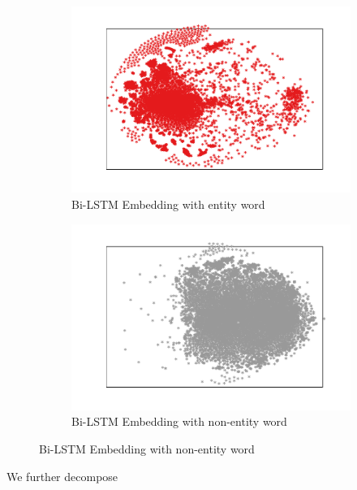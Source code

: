 \documentclass{article}
\begin{document}
\begin{itemize}
\begin{figure}[t]
	\centering
	\begin{subfigure}{0.5\textwidth}
		\includegraphics[width=\linewidth]{bi_lstm_gold_positive.pdf}
		\caption{Bi-LSTM Embedding with entity word}
		\label{fig:bi_lstm_gold_positive}
	\end{subfigure}\hfil 
	\begin{subfigure}{0.5\textwidth}
		\includegraphics[width=\linewidth]{bi_lstm_gold_negative.pdf}
		\caption{Bi-LSTM Embedding with non-entity word}
		\label{fig:bi_lstm_gold_negative}
	\end{subfigure}
\end{figure}

We further decompose 




\end{itemize}
\end{document}
